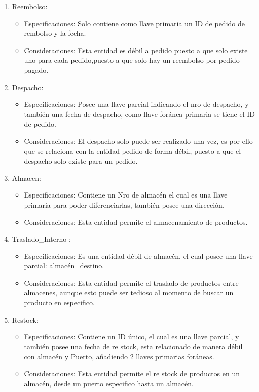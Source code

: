 \documentclass[10pt, a4paper,openany]{report}
\begin{document}
\begin{enumerate}
	\item  Reembolso:
	      \begin{itemize}
		      \item Especificaciones:
		            Solo contiene como llave primaria un ID de pedido de rembolso y la fecha.
		      \item Consideraciones:
		            Esta entidad es débil a pedido puesto a que solo existe uno para cada pedido,puesto a que solo hay un reembolso por pedido pagado.
	      \end{itemize}

	\item  Despacho:
	      \begin{itemize}
		      \item Especificaciones:
		            Posee una llave parcial indicando el nro de despacho, y también una fecha de despacho, como llave foránea primaria se tiene el ID de pedido.
		      \item Consideraciones:
		            El despacho solo puede ser realizado una vez, es por ello que se relaciona con la entidad pedido de forma débil, puesto a que el despacho solo existe para un pedido.
	      \end{itemize}


	\item  Almacen:
	      \begin{itemize}
		      \item Especificaciones:
		            Contiene un Nro de almacén el cual es una llave primaria para poder diferenciarlas, también posee una dirección.
		      \item Consideraciones:
		            Esta entidad permite el almacenamiento de productos.
	      \end{itemize}

	\item Traslado\_Interno :
	      \begin{itemize}
		      \item Especificaciones:
		            Es una entidad débil de almacén, el cual posee una llave parcial: almacén\_destino.
		      \item Consideraciones:
		            Esta entidad permite el traslado de productos entre almacenes, aunque esto puede ser tedioso al momento de buscar un producto en especifico.
	      \end{itemize}


	\item  Restock:
	      \begin{itemize}
		      \item Especificaciones:
		            Contiene un ID único, el cual es una llave parcial, y también posee una fecha de re stock, esta relacionado de manera débil con almacén y Puerto, añadiendo 2 llaves primarias foráneas.
		      \item Consideraciones:
		            Esta entidad permite el re stock de productos en un almacén, desde un puerto especifico hasta un almacén.
	      \end{itemize}


\end{enumerate}
\end{document}
